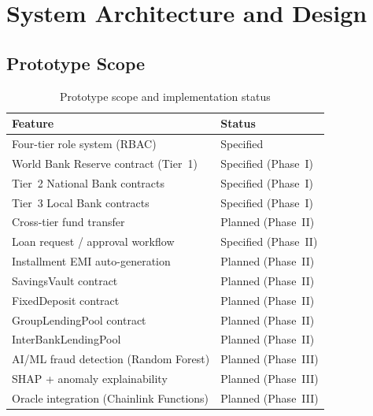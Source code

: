 \documentclass[12pt, a4paper]{report}
\newcommand{\tmarkPartial}{\faHourglassHalf}
\newcommand{\tmarkPlanned}{\textcolor{black!55}{\faCircle}}
\newcommand{\tableheadcolor}{\rowcolor{TableHeadBg}}
\newcommand{\tableheadfont}{\bfseries}
\begin{document}
\chapter{System Architecture and Design}

\section{Prototype Scope}
\label{sec:prototype-scope}

\begin{table}[H]
\centering
\caption[Prototype scope and implementation status]{Prototype scope and implementation status}
\label{tab:prototype-scope}
\footnotesize
\renewcommand{\arraystretch}{0.88}
\setlength{\tabcolsep}{3pt}
\begin{tabular}{@{}p{7.1cm}>{\raggedleft\arraybackslash}p{5.9cm}@{}}
\toprule
\tableheadcolor
\tableheadfont Feature & \tableheadfont Status \\
\midrule
Four-tier role system (RBAC) & \tmarkPartial{} Specified \\
\rowcolor{RowShade}
World Bank Reserve contract (Tier~1) & \tmarkPartial{} Specified (Phase~I) \\
Tier~2 National Bank contracts & \tmarkPartial{} Specified (Phase~I) \\
\rowcolor{RowShade}
Tier~3 Local Bank contracts & \tmarkPartial{} Specified (Phase~I) \\
Cross-tier fund transfer & \tmarkPlanned{} Planned (Phase~II) \\
\rowcolor{RowShade}
Loan request / approval workflow & \tmarkPartial{} Specified (Phase~II) \\
Installment EMI auto-generation & \tmarkPlanned{} Planned (Phase~II) \\
\rowcolor{RowShade}
SavingsVault contract & \tmarkPlanned{} Planned (Phase~II) \\
FixedDeposit contract & \tmarkPlanned{} Planned (Phase~II) \\
\rowcolor{RowShade}
GroupLendingPool contract & \tmarkPlanned{} Planned (Phase~II) \\
InterBankLendingPool & \tmarkPlanned{} Planned (Phase~II) \\
\rowcolor{RowShade}
AI/ML fraud detection (Random Forest) & \tmarkPlanned{} Planned (Phase~III) \\
SHAP + anomaly explainability & \tmarkPlanned{} Planned (Phase~III) \\
\rowcolor{RowShade}
Oracle integration (Chainlink Functions) & \tmarkPlanned{} Planned (Phase~III) \\

\end{tabular}
\end{table}
\end{document}
